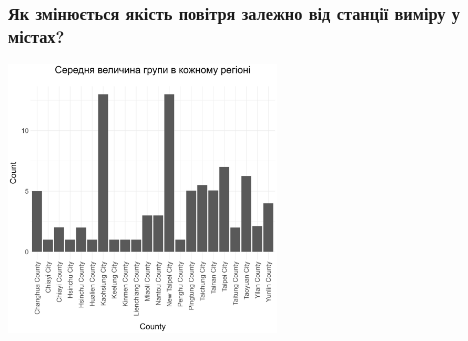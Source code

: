 \documentclass{beamer}
\begin{document}
\begin{frame}
  \frametitle{Як змінюється якість повітря залежно від станції виміру у містах?}

  \begin{center}
    \includegraphics[height=2.8in]{plots/question7/bar-count.png}
  \end{center}
\end{frame}
\end{document}
